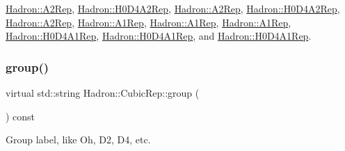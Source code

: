 \mbox{\hyperlink{structHadron_1_1A2Rep_a6c2da481eeb98634c640e8f17a569eea}{Hadron\+::\+A2\+Rep}}, \mbox{\hyperlink{structHadron_1_1H0D4A2Rep_a637522dc6caee2869b2bb632a4c5a5b5}{Hadron\+::\+H0\+D4\+A2\+Rep}}, \mbox{\hyperlink{structHadron_1_1A2Rep_a6c2da481eeb98634c640e8f17a569eea}{Hadron\+::\+A2\+Rep}}, \mbox{\hyperlink{structHadron_1_1H0D4A2Rep_a637522dc6caee2869b2bb632a4c5a5b5}{Hadron\+::\+H0\+D4\+A2\+Rep}}, \mbox{\hyperlink{structHadron_1_1A2Rep_a6c2da481eeb98634c640e8f17a569eea}{Hadron\+::\+A2\+Rep}}, \mbox{\hyperlink{structHadron_1_1A1Rep_a0d1f85837b8f29f9e51656b8bf2abfed}{Hadron\+::\+A1\+Rep}}, \mbox{\hyperlink{structHadron_1_1A1Rep_a0d1f85837b8f29f9e51656b8bf2abfed}{Hadron\+::\+A1\+Rep}}, \mbox{\hyperlink{structHadron_1_1A1Rep_a0d1f85837b8f29f9e51656b8bf2abfed}{Hadron\+::\+A1\+Rep}}, \mbox{\hyperlink{structHadron_1_1H0D4A1Rep_ab13ff026da1bc59df4b52835038296d5}{Hadron\+::\+H0\+D4\+A1\+Rep}}, \mbox{\hyperlink{structHadron_1_1H0D4A1Rep_ab13ff026da1bc59df4b52835038296d5}{Hadron\+::\+H0\+D4\+A1\+Rep}}, and \mbox{\hyperlink{structHadron_1_1H0D4A1Rep_ab13ff026da1bc59df4b52835038296d5}{Hadron\+::\+H0\+D4\+A1\+Rep}}.

\mbox{\label{structHadron_1_1CubicRep_a0748f11ec87f387062c8e8981339a29c}} 
\subsubsection{\texorpdfstring{group()}{group()}\hspace{0.1cm}{\footnotesize\ttfamily [1/3]}}
{\footnotesize\ttfamily virtual std\+::string Hadron\+::\+Cubic\+Rep\+::group (\begin{DoxyParamCaption}{ }\end{DoxyParamCaption}) const\hspace{0.3cm}{\ttfamily [pure virtual]}}

Group label, like Oh, D2, D4, etc. 

